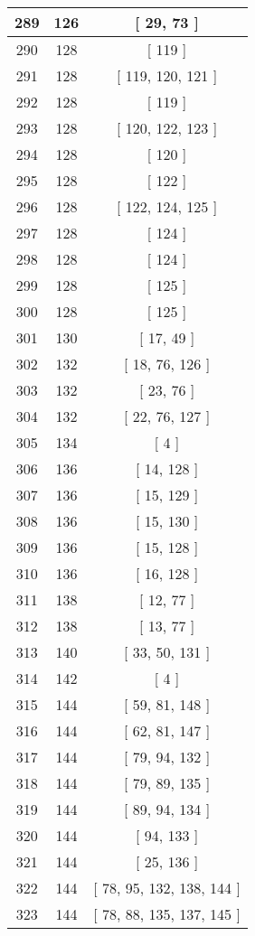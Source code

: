 \begin{center}
\begin{longtable}[H]{|| c c c ||}
\hline
289 & 126 & [ 29, 73 ] \\ 
\hline
290 & 128 & [ 119 ] \\ 
\hline
291 & 128 & [ 119, 120, 121 ] \\ 
\hline
292 & 128 & [ 119 ] \\ 
\hline
293 & 128 & [ 120, 122, 123 ] \\ 
\hline
294 & 128 & [ 120 ] \\ 
\hline
295 & 128 & [ 122 ] \\ 
\hline
296 & 128 & [ 122, 124, 125 ] \\ 
\hline
297 & 128 & [ 124 ] \\ 
\hline
298 & 128 & [ 124 ] \\ 
\hline
299 & 128 & [ 125 ] \\ 
\hline
300 & 128 & [ 125 ] \\ 
\hline
301 & 130 & [ 17, 49 ] \\ 
\hline
302 & 132 & [ 18, 76, 126 ] \\ 
\hline
303 & 132 & [ 23, 76 ] \\ 
\hline
304 & 132 & [ 22, 76, 127 ] \\ 
\hline
305 & 134 & [ 4 ] \\ 
\hline
306 & 136 & [ 14, 128 ] \\ 
\hline
307 & 136 & [ 15, 129 ] \\ 
\hline
308 & 136 & [ 15, 130 ] \\ 
\hline
309 & 136 & [ 15, 128 ] \\ 
\hline
310 & 136 & [ 16, 128 ] \\ 
\hline
311 & 138 & [ 12, 77 ] \\ 
\hline
312 & 138 & [ 13, 77 ] \\ 
\hline
313 & 140 & [ 33, 50, 131 ] \\ 
\hline
314 & 142 & [ 4 ] \\ 
\hline
315 & 144 & [ 59, 81, 148 ] \\ 
\hline
316 & 144 & [ 62, 81, 147 ] \\ 
\hline
317 & 144 & [ 79, 94, 132 ] \\ 
\hline
318 & 144 & [ 79, 89, 135 ] \\ 
\hline
319 & 144 & [ 89, 94, 134 ] \\ 
\hline
320 & 144 & [ 94, 133 ] \\ 
\hline
321 & 144 & [ 25, 136 ] \\ 
\hline
322 & 144 & [ 78, 95, 132, 138, 144 ] \\ 
\hline
323 & 144 & [ 78, 88, 135, 137, 145 ] \\ 

\end{longtable}
\end{center}
